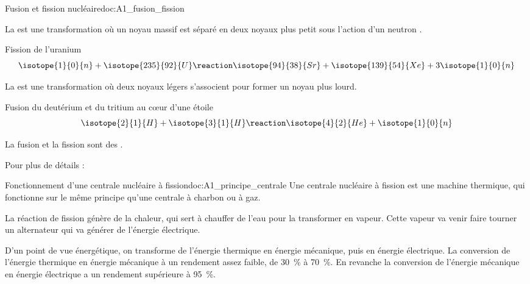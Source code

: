 \begin{doc}{Fusion et fission nucléaire}{doc:A1_fusion_fission}
  \begin{importants}
    La  est une transformation où un noyau massif est séparé en deux noyaux plus petit sous l'action d'un neutron .
  \end{importants}
  \exemple Fission de l'uranium 
  \begin{equation*} 
    \isotope{1}{0}{n} + \isotope{235}{92}{U} \reaction \isotope{94}{38}{Sr} + \isotope{139}{54}{Xe} + 3\isotope{1}{0}{n}
  \end{equation*}
  
  \begin{importants}
    La  est une transformation où deux noyaux légers s'associent pour former un noyau plus lourd.
  \end{importants}
  \exemple Fusion du deutérium et du tritium au c\oe{}ur d'une étoile
  \begin{equation*}
    \isotope{2}{1}{H} + \isotope{3}{1}{H} \reaction \isotope{4}{2}{He} + \isotope{1}{0}{n}
  \end{equation*}
  
  \phantom{b}\vspace*{-12pt}
  
  \begin{importants}
    La fusion et la fission sont des .
  \end{importants}

  Pour plus de détails :
\end{doc}

\begin{doc}{Fonctionnement d'une centrale nucléaire à fission}{doc:A1_principe_centrale}
  Une centrale nucléaire à fission est une machine thermique, qui fonctionne sur le même principe qu'une centrale à charbon ou à gaz.

  La réaction de fission génère de la chaleur, qui sert à chauffer de l'eau pour la transformer en vapeur.
  Cette vapeur va venir faire tourner un alternateur qui va générer de l'énergie électrique.
  \bigskip

  D'un point de vue énergétique, on transforme de l'énergie thermique en énergie mécanique, puis en énergie électrique.
  La conversion de l'énergie thermique en énergie mécanique à un rendement assez faible, de \qty{30}{\percent} à \qty{70}{\percent}.
  En revanche la conversion de l'énergie mécanique en énergie électrique a un rendement supérieure à \qty{95}{\percent}.
\end{doc}


